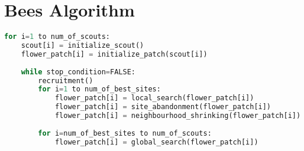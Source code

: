 \newpage
\section{Bees Algorithm}

\begin{lstlisting}[language=Python, caption=Bees Algorithm (Pseudocode) {\cite{Wiki08}}]
for i=1 to num_of_scouts:
    scout[i] = initialize_scout()
    flower_patch[i] = initialize_patch(scout[i])
    
    while stop_condition=FALSE:
        recruitment()
        for i=1 to num_of_best_sites:
            flower_patch[i] = local_search(flower_patch[i])
            flower_patch[i] = site_abandonment(flower_patch[i])
            flower_patch[i] = neighbourhood_shrinking(flower_patch[i])
    
        for i=num_of_best_sites to num_of_scouts:
            flower_patch[i] = global_search(flower_patch[i])
\end{lstlisting}

\clearpage
\newpage
